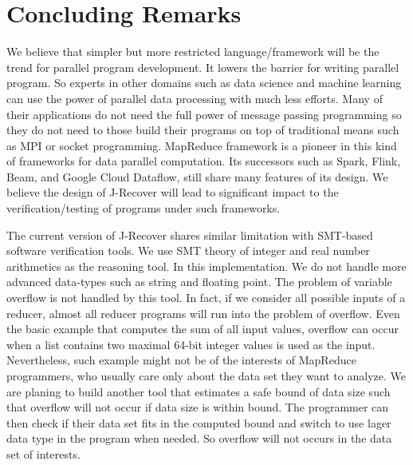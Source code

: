 \documentclass{llncs}
\begin{document}
\section{Concluding Remarks}
We believe that simpler but more restricted language/framework will be the trend for parallel program development. It lowers the barrier for writing parallel program. So experts in other domains such as data science and machine learning can use the power of parallel data processing with much less efforts. Many of their applications do not need the full power of message passing programming so they do not need to those build their programs on top of traditional means such as MPI or socket programming. MapReduce framework is a pioneer in this kind of frameworks for data parallel computation. Its successors such as Spark, Flink, Beam, and Google Cloud Dataflow, still share many features of its design. We believe the design of J-Recover will lead to significant impact to the verification/testing of programs under such frameworks.

The current version of J-Recover shares similar limitation with SMT-based software verification tools.
We use SMT theory of integer and real number arithmetics as the reasoning tool. In this implementation. We do not handle more advanced data-types such as string and floating point. The problem of variable overflow is not handled by this tool. In fact, if we consider all possible inputs of a reducer, almost all reducer programs will run into the problem of overflow. Even the basic example that computes the sum of all input values, overflow can occur when a list contains two maximal 64-bit integer values is used as the input. Nevertheless, such example might not be of the interests of MapReduce programmers, who usually care only about the data set they want to analyze. We are planing to build another tool that estimates a safe bound of data size such that overflow will not occur if data size is within bound. The programmer can then check if their data set fits in the computed bound and switch to use lager data type in the program when needed. So overflow will not occurs in the data set of interests.



%

\end{document}
